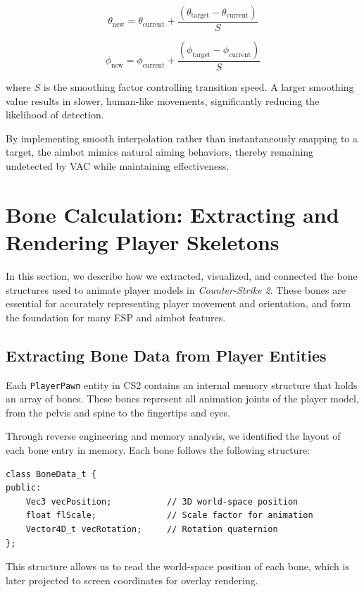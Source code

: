 \[
\theta_{\text{new}} = \theta_{\text{current}} + \frac{(\theta_{\text{target}} - \theta_{\text{current}})}{S}
\]

\[
\phi_{\text{new}} = \phi_{\text{current}} + \frac{(\phi_{\text{target}} - \phi_{\text{current}})}{S}
\]

where \( S \) is the smoothing factor controlling transition speed. A larger smoothing value results in slower, human-like movements, significantly reducing the likelihood of detection.

By implementing smooth interpolation rather than instantaneously snapping to a target, the aimbot mimics natural aiming behaviors, thereby remaining undetected by VAC while maintaining effectiveness.

\newpage

\section{Bone Calculation: Extracting and Rendering Player Skeletons}

In this section, we describe how we extracted, visualized, and connected the bone structures used to animate player models in \textit{Counter-Strike 2}. These bones are essential for accurately representing player movement and orientation, and form the foundation for many ESP and aimbot features.

\subsection{Extracting Bone Data from Player Entities}

Each \texttt{PlayerPawn} entity in CS2 contains an internal memory structure that holds an array of bones. These bones represent all animation joints of the player model, from the pelvis and spine to the fingertips and eyes.

Through reverse engineering and memory analysis, we identified the layout of each bone entry in memory. Each bone follows the following structure:

\begin{lstlisting}[style=cppstyle, caption={Bone Memory Structure}]
class BoneData_t {
public:
    Vec3 vecPosition;           // 3D world-space position
    float flScale;              // Scale factor for animation
    Vector4D_t vecRotation;     // Rotation quaternion
};
\end{lstlisting}

This structure allows us to read the world-space position of each bone, which is later projected to screen coordinates for overlay rendering.

